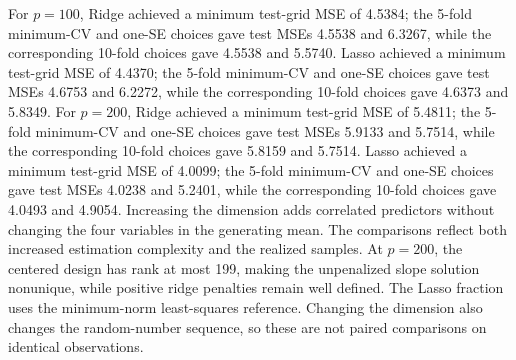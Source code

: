 For $p=100$, Ridge achieved a minimum test-grid MSE of 4.5384; the 5-fold minimum-CV and one-SE choices gave test MSEs 4.5538 and 6.3267, while the corresponding 10-fold choices gave 4.5538 and 5.5740. Lasso achieved a minimum test-grid MSE of 4.4370; the 5-fold minimum-CV and one-SE choices gave test MSEs 4.6753 and 6.2272, while the corresponding 10-fold choices gave 4.6373 and 5.8349. For $p=200$, Ridge achieved a minimum test-grid MSE of 5.4811; the 5-fold minimum-CV and one-SE choices gave test MSEs 5.9133 and 5.7514, while the corresponding 10-fold choices gave 5.8159 and 5.7514. Lasso achieved a minimum test-grid MSE of 4.0099; the 5-fold minimum-CV and one-SE choices gave test MSEs 4.0238 and 5.2401, while the corresponding 10-fold choices gave 4.0493 and 4.9054. Increasing the dimension adds correlated predictors without changing the four variables in the generating mean. The comparisons reflect both increased estimation complexity and the realized samples. At $p=200$, the centered design has rank at most 199, making the unpenalized slope solution nonunique, while positive ridge penalties remain well defined. The Lasso fraction uses the minimum-norm least-squares reference. Changing the dimension also changes the random-number sequence, so these are not paired comparisons on identical observations.
